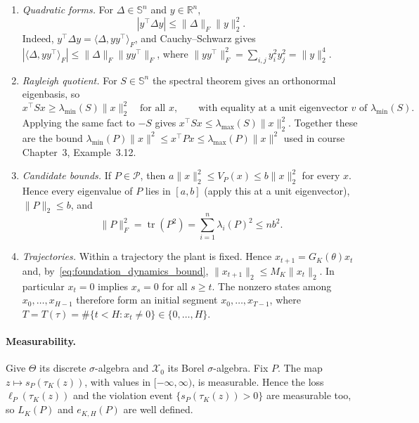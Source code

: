 \begin{enumerate}
\item[(F1)] \emph{Quadratic forms.} For $\Delta\in\mathbb S^n$ and
$y\in\mathbb R^n$,
\begin{equation}
\label{eq:theory_quadratic_form}
 |y^\top\Delta y|\le\|\Delta\|_F\|y\|_2^2 .
\end{equation}
Indeed, $y^\top\Delta y=\langle\Delta,yy^\top\rangle_F$, and Cauchy--Schwarz
gives $|\langle\Delta,yy^\top\rangle_F|\le\|\Delta\|_F\|yy^\top\|_F$, where
$\|yy^\top\|_F^2=\sum_{i,j}y_i^2y_j^2=\|y\|_2^4$.

\item[(F2)] \emph{Rayleigh quotient.} For $S\in\mathbb S^n$ the spectral
theorem gives an orthonormal eigenbasis, so
\begin{equation}
\label{eq:theory_rayleigh}
 x^\top Sx\ge\lambda_{\min}(S)\|x\|_2^2\quad\text{for all }x,
 \qquad\text{with equality at a unit eigenvector } v \text{ of }\lambda_{\min}(S).
\end{equation}
Applying the same fact to $-S$ gives $x^\top Sx\le\lambda_{\max}(S)\|x\|_2^2$.
Together these are the bound
$\lambda_{\min}(P)\|x\|^2\le x^\top Px\le\lambda_{\max}(P)\|x\|^2$ used in
course Chapter~3, Example~3.12.

\item[(F3)] \emph{Candidate bounds.} If $P\in\mathcal P$, then
$a\|x\|_2^2\le V_P(x)\le b\|x\|_2^2$ for every $x$. Hence every
eigenvalue of $P$ lies in $[a,b]$ (apply this at a unit eigenvector),
$\|P\|_2\le b$, and
\begin{equation}
\label{eq:theory_frobenius_bound}
 \|P\|_F^2=\operatorname{tr}(P^2)=\sum_{i=1}^n\lambda_i(P)^2\le nb^2 .
\end{equation}

\item[(F4)] \emph{Trajectories.} Within a trajectory the plant is fixed.
Hence $x_{t+1}=G_K(\theta)x_t$ and,
by~\eqref{eq:foundation_dynamics_bound},
$\|x_{t+1}\|_2\le M_K\|x_t\|_2$. In particular $x_t=0$ implies $x_s=0$ for all
$s\ge t$. The nonzero states among $x_0,\ldots,x_{H-1}$ therefore form an
initial segment $x_0,\ldots,x_{T-1}$, where
$T=T(\tau)=\#\{t<H:x_t\ne0\}\in\{0,\ldots,H\}$.
\end{enumerate}

\paragraph{Measurability.}
Give $\Theta$ its discrete $\sigma$-algebra and $\mathcal X_0$ its Borel
$\sigma$-algebra. Fix $P$. The map $z\mapsto s_P(\tau_K(z))$, with values
in $[-\infty,\infty)$, is measurable. Hence the loss $\ell_P(\tau_K(z))$
and the violation event $\{s_P(\tau_K(z))>0\}$ are measurable too, so
$L_K(P)$ and $e_{K,H}(P)$ are well defined.

